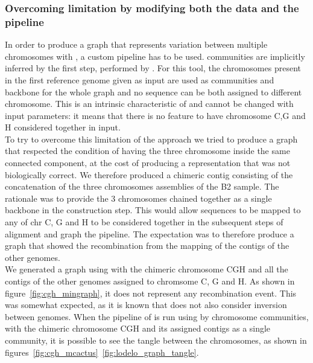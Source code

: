 \subsubsection{Overcoming \mcactus limitation by modifying both the data and the pipeline}
In order to produce a graph that represents variation between multiple chromosomes with \mcactus, a custom pipeline has to be used. \mcactus communities are implicitly inferred by the first step, performed by \minigraph. For this tool, the chromosomes present in the first reference genome given as input are used as communities and backbone for the whole graph and no sequence can be both assigned to different chromosome. This is an intrinsic characteristic of \minigraph and cannot be changed with input parameters: it means that there is no feature to have chromosome C,G and H considered together in input.\\
To try to overcome this limitation of the approach we tried to produce a graph that respected the condition of having the three chromosome inside the same connected component, at the cost of producing a representation that was not biologically correct. We therefore produced a chimeric contig consisting of the concatenation of the three chromosomes assemblies of the B2 sample. The rationale was to provide the 3 chromosomes chained together as a single backbone in the \minigraph construction step. This would allow sequences to be mapped to any of chr C, G and H to be considered together in the subsequent steps of alignment and graph the \mcactus pipeline. The expectation was to therefore produce a graph that showed the recombination from the mapping of the contigs of the other genomes. \\
We generated a graph using \minigraph with the chimeric chromosome CGH and all the contigs of the other genomes assigned to chromsome C, G and H. As shown in figure~\ref{fig:cgh_mingraph}, it does not represent any recombination event. This was somewhat expected, as it is known that \minigraph does not also consider inversion between genomes.
When the pipeline of \mcactus is run using by chromosome communities, with the chimeric chromosome CGH and its assigned contigs as a single community, it is possible to see the tangle between the chromosomes, as shown in figures~\ref{fig:cgh_mcactus}~\ref{fig:lodelo_graph_tangle}.
